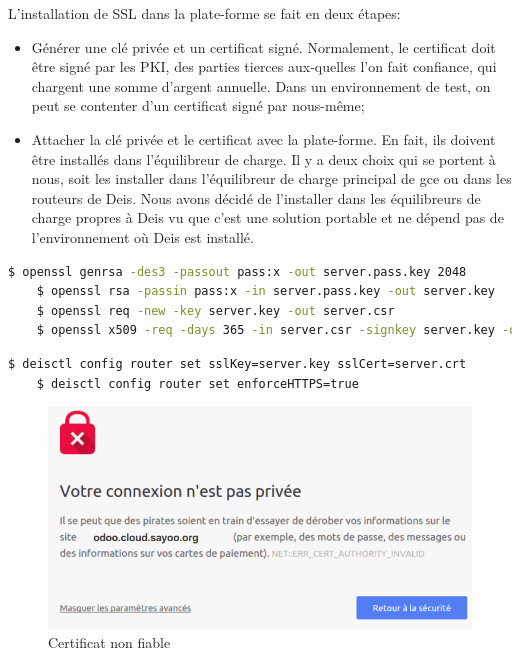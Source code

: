 \begin{onehalfspace}
L'installation de SSL dans la plate-forme se fait en deux étapes:
\begin{itemize}
	\item Générer une clé privée et un certificat signé. Normalement, le certificat doit être signé par les PKI, des parties tierces aux-quelles l'on fait confiance, qui chargent une somme d'argent annuelle. Dans un environnement de test, on peut se contenter d'un certificat signé par nous-même;
	\item Attacher la clé privée et le certificat avec la plate-forme. En fait, ils doivent être installés dans l'équilibreur de charge. Il y a deux choix qui se portent à nous, soit les installer dans l'équilibreur de charge principal de \acrshort{gce} ou dans les routeurs de Deis. Nous avons décidé de l'installer dans les équilibreurs de charge propres à Deis vu que c'est une solution portable et ne dépend pas de l'environnement où Deis est installé.
\end{itemize}

\begin{lstlisting}[language=bash,caption=Génération de la clé privée et le certificat]
	$ openssl genrsa -des3 -passout pass:x -out server.pass.key 2048
	$ openssl rsa -passin pass:x -in server.pass.key -out server.key
	$ openssl req -new -key server.key -out server.csr
	$ openssl x509 -req -days 365 -in server.csr -signkey server.key -out server.crt
\end{lstlisting}

\begin{lstlisting}[language=bash,caption=Activation du protocole SSL]
	$ deisctl config router set sslKey=server.key sslCert=server.crt
	$ deisctl config router set enforceHTTPS=true
\end{lstlisting}

\begin{figure}[H]
\centering
\includegraphics [scale=0.5]{chapitre5/assets/certificat}
\caption{Certificat non fiable}
\label{fig:certificat}
\end{figure}


\end{onehalfspace}
